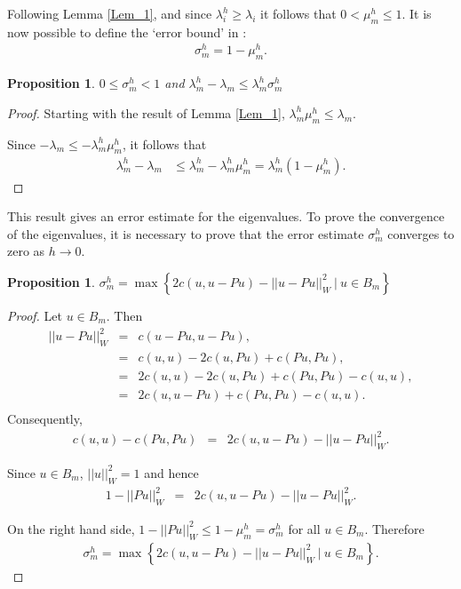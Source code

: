 \documentclass[../../main.tex]{subfiles}
\begin{document}
Following Lemma \ref{Lem_1}, and since $\lambda_{i}^{h} \geq \lambda_{i}$ it follows that $0 < \mu_{m}^{h} \leq 1$. It is now possible to define the `error bound' in \cite{SF73}:
\begin{eqnarray}
	\sigma_{m}^{h} = 1 - \mu_{m}^{h}. \label{eq:error_bound}
\end{eqnarray}


\newtheorem{Cor_1}[Prop_1]{Proposition}
\begin{Cor_1}
	$0 \leq \sigma_{m}^{h} < 1$ and $\lambda_{m}^{h} - \lambda_{m} \leq \lambda_{m}^{h}\sigma_{m}^{h}$
\end{Cor_1}
\begin{proof}
	Starting with the result of Lemma \ref{Lem_1}, $\lambda_{m}^{h}\mu_{m}^{h} \leq \lambda_{m}$.
	
	Since $-\lambda_{m} \leq -\lambda_{m}^{h}\mu_{m}^{h}$, it follows that
	\begin{align*}
		\lambda_{m}^{h} - \lambda_{m} &\leq \lambda_{m}^{h} - \lambda_{m}^{h}\mu_{m}^{h} = \lambda^h_m(1 - \mu^h_m). 
	\end{align*}
\end{proof}

This result gives an error estimate for the eigenvalues. To prove the convergence of the eigenvalues, it is necessary to prove that the error estimate $\sigma_{m}^{h}$ converges to zero as $h \rightarrow 0$.


\newtheorem{Prop_3}[Prop_1]{Proposition} 
\begin{Prop_3}
	\label{Prop_3}
	$\sigma_{m}^{h} = \max\left\{ 2c( u,u-Pu )-||u-Pu||_{W}^{2} \ | \ u \in B_{m} \right\}$
\end{Prop_3}
\begin{proof}
	Let $u \in B_{m}$. Then
	\begin{eqnarray*}
		||u - Pu||_{W}^{2} &=& c( u - Pu, u - Pu ), \\
						&=& c( u, u ) - 2 c( u, Pu ) + c( Pu, Pu ), \\
						&=& 2c( u, u ) - 2 c( u, Pu ) + c( Pu, Pu ) - c( u, u ),\\
						&=& 2c( u, u - Pu ) + c( Pu, Pu ) - c( u, u ).\\
	\end{eqnarray*}
	Consequently,
	\begin{eqnarray*}
		c( u, u ) - c( Pu, Pu )  & = & 2c( u, u - Pu ) - ||u - Pu||_{W}^{2}.
	\end{eqnarray*}

	Since $u \in B_{m}$, $||u||_{W}^{2} = 1$ and hence
	\begin{eqnarray*}
		1 - ||Pu||_{W}^{2}  & = & 2c( u, u - Pu ) - ||u - Pu||_{W}^{2}.
	\end{eqnarray*}

	On the right hand side, $1 - ||Pu||_{W}^{2} \leq 1 - \mu_{m}^{h} = \sigma_{m}^{h}$ for all $u \in B_{m}$. Therefore
	\begin{eqnarray*}
	\sigma_{m}^{h} = \max\left\{ 2c( u,u-Pu )-||u-Pu||_{W}^{2} \ | \ u \in B_{m} \right \}.
	\end{eqnarray*}
\end{proof}
\end{document}
